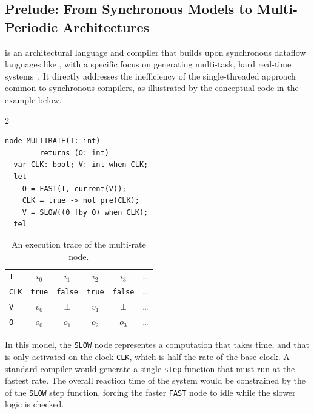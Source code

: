 \subsection{Prelude: From Synchronous Models to Multi-Periodic Architectures}
\label{sec:sota:synchronous:prelude}

\Prelude is an architectural language and compiler that builds upon synchronous dataflow languages
like \Lustre, with a specific focus on generating multi-task, hard real-time
systems~\cite{DBLP:journals/deds/PagettiFBCL11}. It directly addresses the inefficiency of the
single-threaded approach common to synchronous compilers, as illustrated by the conceptual \Lustre
code in the example below.

\begin{multicols}{2}
  \begin{lstlisting}[basicstyle=\ttfamily\footnotesize\color{BlackText}]
  node MULTIRATE(I: int)
        returns (O: int)
  var CLK: bool; V: int when CLK;
  let
    O = FAST(I, current(V));
    CLK = true -> not pre(CLK);
    V = SLOW((0 fby O) when CLK);
  tel
\end{lstlisting}
  \newcolumn
  \begin{table}[H]
    \centering
    \begin{tabular}{l|ccccc}
      \texttt{I}   & $i_0$         & $i_1$          & $i_2$         & $i_3$          & \dots \\
      \texttt{CLK} & \texttt{true} & \texttt{false} & \texttt{true} & \texttt{false} & \dots \\
      \texttt{V}   & $v_0$         & $\bot$         & $v_1$         & $\bot$         & \dots \\
      \texttt{O}   & $o_0$         & $o_1$          & $o_2$         & $o_3$          & \dots \\
    \end{tabular}
    \caption{An execution trace of the multi-rate node.}
    \label{tab:sota:synchronous:lustre:gap}
  \end{table}
\end{multicols}

In this model, the \texttt{SLOW} node representes a computation that takes time, and that is only
activated on the clock \texttt{CLK}, which is half the rate of the base clock. A standard compiler
would generate a single \texttt{step} function that must run at the fastest rate. The overall
reaction time of the system would be constrained by the \wcet of the \texttt{SLOW} step function,
forcing the faster \texttt{FAST} node to idle while the slower logic is checked.

